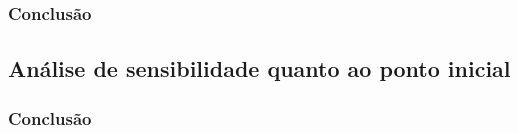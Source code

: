 \documentclass[11pt,a4paper]{article}
\begin{document}
        
        
        

        \subsubsection{Conclusão}

        
    
        \newpage
        
    \subsection{Análise de sensibilidade quanto ao ponto inicial}
            
        
        
        \subsubsection{Conclusão}

        
    
        \newpage
\end{document}

